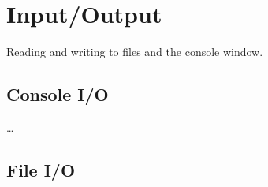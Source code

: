\chapter{Input/Output}

Reading and writing to files and the console window.
\section{Console I/O}
\dots
\section{File I/O}

